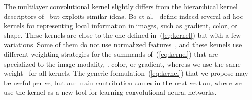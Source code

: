 The multilayer convolutional kernel slightly differs from the hierarchical kernel descriptors
of~\cite{bo2011} but exploits similar ideas. Bo et al.~\cite{bo2011} define
indeed several ad hoc kernels for representing local information in images,
such as gradient, color, or shape. These kernels are close to the one
defined in~(\ref{eq:kernel}) but with a few variations. Some of them do not
use normalized features~, and these kernels use different
weighting strategies for the summands of~(\ref{eq:kernel}) that are specialized
to the image modality, \eg, color, or gradient, whereas we use the same
weight~ for all kernels. The generic
formulation~(\ref{eq:kernel}) that we propose may be useful per
se, but our main contribution comes in the next section, where we use the  
kernel as a new tool for learning convolutional neural networks.

